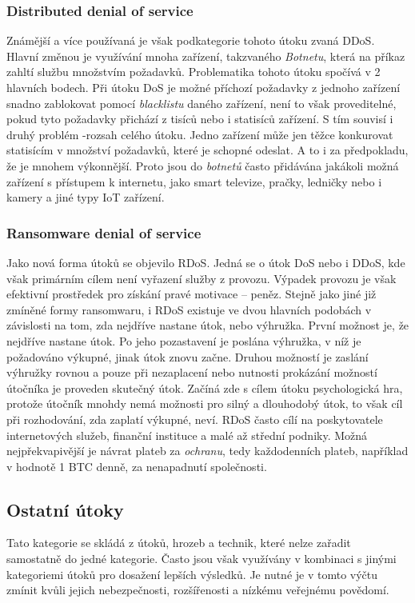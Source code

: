\subsubsection{Distributed denial of service}
Známější a více používaná je však podkategorie tohoto útoku zvaná \ac{DDoS}.
Hlavní změnou je využívání mnoha zařízení, takzvaného \textit{Botnetu}, která na příkaz zahltí službu množstvím požadavků.
Problematika tohoto útoku spočívá v 2 hlavních bodech.
Při útoku \ac{DoS} je možné příchozí požadavky z jednoho zařízení snadno zablokovat pomocí \textit{blacklistu} daného zařízení, není to však proveditelné, pokud tyto požadavky přichází z tisíců nebo i statisíců zařízení.
S tím souvisí i druhý problém -rozsah celého útoku.
Jedno zařízení může jen těžce konkurovat statisícím v množství požadavků, které je schopné odeslat.
A to i za předpokladu, že je mnohem výkonnější.
Proto jsou do \textit{botnetů} často přidávána jakákoli možná zařízení s přístupem k internetu, jako smart televize, pračky, ledničky nebo i kamery a jiné typy \ac{IoT} zařízení.\cite{cisco_most_common_attack}



\subsubsection{Ransomware denial of service}
Jako nová forma útoků se objevilo \ac{RDoS}.
Jedná se o útok \ac{DoS} nebo i \ac{DDoS}, kde však primárním cílem není vyřazení služby z provozu.
Výpadek provozu je však efektivní prostředek pro získání pravé motivace -- peněz.
Stejně jako jiné již zmíněné formy ransomwaru, i \ac{RDoS} existuje ve dvou hlavních podobách v závislosti na tom, zda nejdříve nastane útok, nebo výhružka.
První možnost je, že nejdříve nastane útok.
Po jeho pozastavení je poslána výhružka, v níž je požadováno výkupné, jinak útok znovu začne.
Druhou možností je zaslání výhružky rovnou a pouze při nezaplacení nebo nutnosti prokázání možností útočníka je proveden skutečný útok.
Začíná zde s cílem útoku psychologická hra, protože útočník mnohdy nemá možnosti pro silný a dlouhodobý útok, to však cíl při rozhodování, zda zaplatí výkupné, neví.
\ac{RDoS} často cílí na poskytovatele internetových služeb, finanční instituce a malé až střední podniky.
Možná nejpřekvapivější je návrat plateb za \textit{ochranu}, tedy každodenních plateb, například v hodnotě 1 BTC denně, za nenapadnutí společnosti.\cite{Enisa_thread_landscape}


\subsection{Ostatní útoky}\label{subsec:ostatni-utoky}
Tato kategorie se skládá z útoků, hrozeb a technik, které nelze zařadit samostatně do jedné kategorie.
Často jsou však využívány v kombinaci s jinými kategoriemi útoků pro dosažení lepších výsledků.
Je nutné je v tomto výčtu zmínit kvůli jejich nebezpečnosti, rozšířenosti a nízkému veřejnému povědomí.


